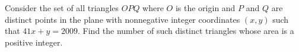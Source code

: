 Consider the set of all triangles $ OPQ$ where $ O$ is the origin and $ P$ and $ Q$ are distinct points in the plane with nonnegative integer coordinates $ (x,y)$ such that $ 41x+y = 2009$. Find the number of such distinct triangles whose area is a positive integer.